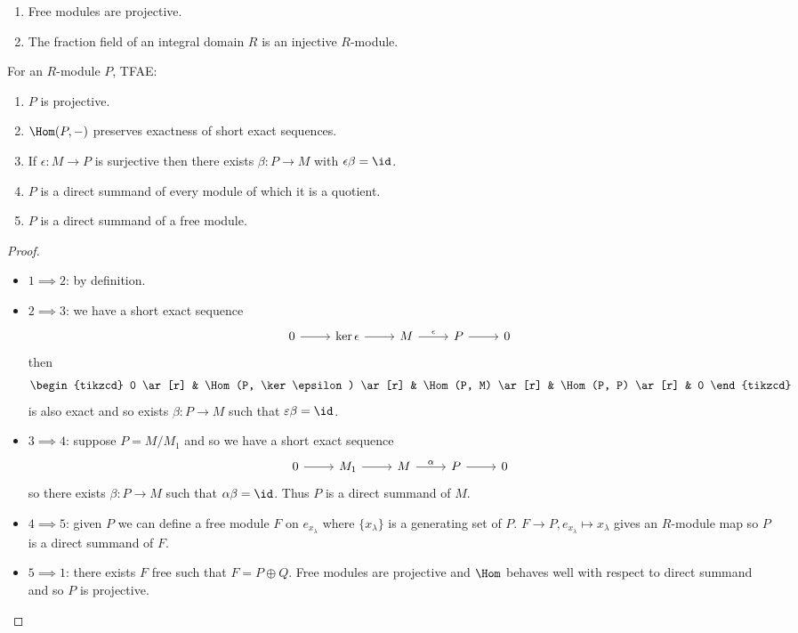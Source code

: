 \documentclass[a4paper]{article}
\begin{document}
\begin{eg}\leavevmode
  \begin{enumerate}
  \item Free modules are projective.
  \item The fraction field of an integral domain \(R\) is an injective \(R\)-module.
  \end{enumerate}
\end{eg}

\begin{lemma}
  For an \(R\)-module \(P\), TFAE:
  \begin{enumerate}
  \item \(P\) is projective.
  \item \(\Hom(P, -)\) preserves exactness of short exact sequences.
  \item If \(\epsilon: M \to P\) is surjective then there exists \(\beta: P \to M\) with \(\epsilon \beta = \id\).
  \item \(P\) is a direct summand of every module of which it is a quotient.
  \item \(P\) is a direct summand of a free module.
  \end{enumerate}
\end{lemma}

\begin{proof}\leavevmode
  \begin{itemize}
  \item \(1 \implies 2\): by definition.
  \item \(2 \implies 3\): we have a short exact sequence
    \[
      \begin{tikzcd}
        0 \ar[r] & \ker \epsilon \ar[r] & M \ar[r, "\epsilon"] & P \ar[r] & 0
      \end{tikzcd}
    \]
    then
    \[
      \begin{tikzcd}
        0 \ar[r] & \Hom(P, \ker \epsilon) \ar[r] & \Hom(P, M) \ar[r] & \Hom(P, P) \ar[r] & 0
      \end{tikzcd}
    \]
    is also exact and so exists \(\beta: P \to M\) such that \(\varepsilon \beta = \id\).
  \item \(3 \implies 4\): suppose \(P = M/M_1\) and so we have a short exact sequence
    \[
      \begin{tikzcd}
        0 \ar[r] & M_1 \ar[r] & M \ar[r, "\alpha"] & P \ar[r] & 0
      \end{tikzcd}
    \]
    so there exists \(\beta: P \to M\) such that \(\alpha \beta = \id\). Thus \(P\) is a direct summand of \(M\).
  \item \(4 \implies 5\): given \(P\) we can define a free module \(F\) on \(e_{x_\lambda}\) where \(\{x_\lambda\}\) is a generating set of \(P\). \(F \to P, e_{x_\lambda} \mapsto x_\lambda\) gives an \(R\)-module map so \(P\) is a direct summand of \(F\).
  \item \(5 \implies 1\): there exists \(F\) free such that \(F = P \oplus Q\). Free modules are projective and \(\Hom\) behaves well with respect to direct summand and so \(P\) is projective.
  \end{itemize}
\end{proof}
\end{document}
